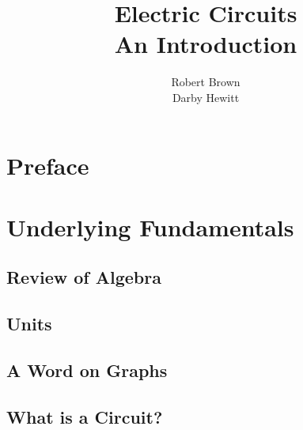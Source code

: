 \documentclass[a4paper,11pt]{book}
\title{\Huge \textbf{Electric Circuits}  \\ \huge An Introduction}
\author{Robert Brown \\ Darby Hewitt}
\newenvironment{dedication}
{
   \cleardoublepage
   \thispagestyle{empty}
   \vspace*{\stretch{1}}
   \hfill\begin{minipage}[t]{0.66\textwidth}
   \raggedright
}
{
   \end{minipage}
   \vspace*{\stretch{3}}
   \clearpage
}
\begin{document}
\frontmatter
\maketitle


\tableofcontents

\mainmatter


\chapter*{Preface}


\chapter{Underlying Fundamentals}
\section{Review of Algebra}


\section{Units} \label{sec:PrelimUnits}

\section{A Word on Graphs}


\section{What is a Circuit?}

\end{document}

